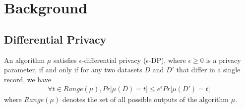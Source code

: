 
\section{Background}

\subsection{Differential Privacy}
\begin{definition} An algorithm $\mu$
satisfies $\epsilon$-differential privacy ($\epsilon$-DP), where $\epsilon \geq 0$ is a privacy parameter, if
and only if for any two datasets $D$ and $D'$ that differ in a single record, we have
\begin{gather}
\forall t \in Range(\mu), Pr \big[\mu(D) = t\big] \leq e^{\epsilon}Pr\big[\mu(D') = t\big]
\end{gather}
where $Range(\mu)$ denotes the set of all possible outputs
of the algorithm $\mu$.
\end{definition}


